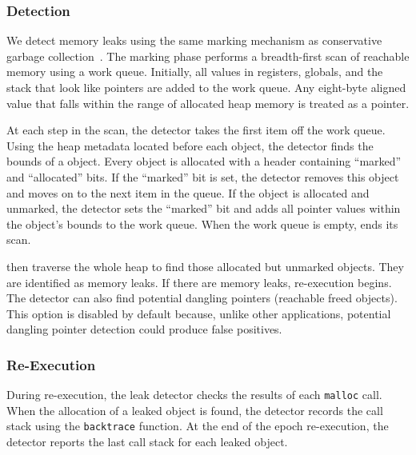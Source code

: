 \subsubsection*{Detection}

We detect memory leaks using the same marking mechanism as conservative garbage collection~\cite{Wilson:1992:UGC:645648.664824}. The marking phase performs a breadth-first scan of reachable memory using a work queue. Initially, all values in registers, globals, and the stack that look like pointers are added to the work queue. Any eight-byte aligned value that falls within the range of allocated heap memory is treated as a pointer.

At each step in the scan, the detector takes the first item off the work queue. Using the heap metadata located before each object, the detector finds the bounds of a object. Every object is allocated with a header containing ``marked'' and ``allocated'' bits. If the ``marked'' bit is set, the detector removes this object and moves on to the next item in the queue. If the object is allocated and unmarked, the detector sets the ``marked'' bit and adds all pointer values within the object's bounds to the work queue. When the work queue is empty, \doubletake{} ends its scan.

\doubletake{} then traverse the whole heap to find those allocated but unmarked objects. They are identified as memory leaks. If there are memory leaks, re-execution begins. The detector can also find potential dangling pointers (reachable freed objects). This option is disabled by default because, unlike other applications, potential dangling pointer detection could produce false positives.

\subsubsection*{Re-Execution}

During re-execution, the leak detector checks the results of each \texttt{malloc} call. When the allocation of a leaked object is found, the detector records the call stack using the \texttt{backtrace} function. At the end of the epoch re-execution, the detector reports the last call stack for each leaked object.
